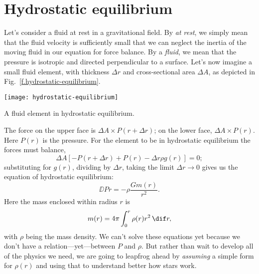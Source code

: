 
\section{Hydrostatic equilibrium}
\label{s.hydrostatic-equilibrium}


Let's consider a fluid at rest in a gravitational field. By \emph{at rest}, we simply mean that the fluid velocity is sufficiently small that we can neglect the inertia of the moving fluid in our equation for force balance.  By a \emph{fluid}, we mean that the pressure is isotropic and directed perpendicular to a surface.  Let's now imagine a small fluid element, with thickness $\Delta r$ and cross-sectional area $\Delta A$, as depicted in Fig.~\ref{f.hydrostatic-equilibrium}.
\begin{marginfigure}
\texttt{[image: hydrostatic-equilibrium]}
\caption[A fluid element in hydrostatic equilibrium]{A fluid element in hydrostatic equilibrium.
\label{f.hydrostatic-equilibrium}}
\end{marginfigure}

The force on the upper face is $\Delta A\times P(r+\Delta r)$; on the lower face, $\Delta A\times P(r)$.  Here $P(r)$ is the pressure.  For the element to be in hydrostatic equilibrium the forces must balance,
\[
        \Delta A \left[ -P(r+\Delta r) + P(r) - \Delta r \rho g(r)  \right] = 0;
\]
substituting for $g(r)$, dividing by $\Delta r$, taking the limit $\Delta r \to 0$ gives us the equation of hydrostatic equilibrium:
\begin{equation}\label{e.hydrostatic-equilibrium}
        \DD{P}{r} = -\rho \frac{Gm(r)}{r^{2}}.
\end{equation}
Here the mass enclosed within radius $r$ is
\begin{equation}\label{e.mass-continuity}
	m(r) = 4\pi \int_{0}^{r}\rho(r)r^{2}\,\dif r,
\end{equation}
with $\rho$ being the mass density. We can't solve these equations yet because we don't have a relation---yet---between $P$ and $\rho$.  But rather than wait to develop all of the physics we need, we are going to leapfrog ahead by \emph{assuming} a simple form for $\rho(r)$ and using that to understand better how stars work.

